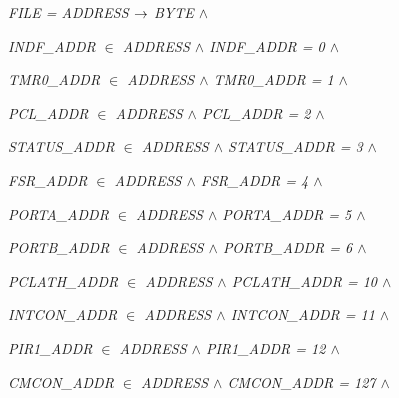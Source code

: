 \begin{sloppypar}
\vspace*{4mm}
\hspace*{0.20in}\it FILE \rm = \it ADDRESS  $\rightarrow$  \it BYTE  $\land$ 

\vspace*{4mm}
\hspace*{0.20in} 

\hspace*{0.20in}\it INDF\_ADDR  $\in$  \it ADDRESS  $\land$ \hspace*{0.25in}\it INDF\_ADDR \rm = \rm 0  $\land$   

\hspace*{0.20in}\it TMR0\_ADDR  $\in$  \it ADDRESS  $\land$ \hspace*{0.25in}\it TMR0\_ADDR \rm = \rm 1  $\land$   

\hspace*{0.20in}\it PCL\_ADDR  $\in$  \it ADDRESS  $\land$ \hspace*{0.25in}\it PCL\_ADDR \rm = \rm 2  $\land$   

\hspace*{0.20in}\it STATUS\_ADDR  $\in$  \it ADDRESS  $\land$  \it STATUS\_ADDR \rm = \rm 3  $\land$   

\hspace*{0.20in}\it FSR\_ADDR  $\in$  \it ADDRESS  $\land$ \hspace*{0.25in}\it FSR\_ADDR \rm = \rm 4  $\land$   

\hspace*{0.20in}\it PORTA\_ADDR  $\in$  \it ADDRESS  $\land$ \hspace*{0.25in}\it PORTA\_ADDR \rm = \rm 5  $\land$   

\hspace*{0.20in}\it PORTB\_ADDR  $\in$  \it ADDRESS  $\land$ \hspace*{0.25in}\it PORTB\_ADDR \rm = \rm 6  $\land$   

\hspace*{0.20in}\it PCLATH\_ADDR  $\in$  \it ADDRESS  $\land$  \it PCLATH\_ADDR \rm = \rm 1\rm 0  $\land$   

\hspace*{0.20in}\it INTCON\_ADDR  $\in$  \it ADDRESS  $\land$  \it INTCON\_ADDR \rm = \rm 1\rm 1  $\land$   

\hspace*{0.20in}\it PIR1\_ADDR  $\in$  \it ADDRESS  $\land$ \hspace*{0.25in}\it PIR1\_ADDR \rm = \rm 1\rm 2  $\land$   

\hspace*{0.20in}\it CMCON\_ADDR  $\in$  \it ADDRESS  $\land$ \hspace*{0.25in}\it CMCON\_ADDR \rm = \rm 1\rm 2\rm 7  $\land$   


\end{sloppypar}
